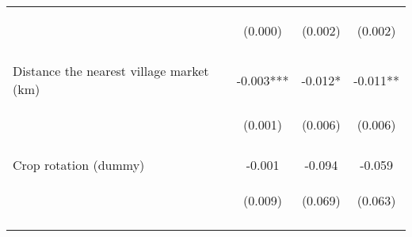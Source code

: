 \begin{center}
\begin{tabular}{lccc}
 & \begin{footnotesize}(0.000)\end{footnotesize} & \begin{footnotesize}(0.002)\end{footnotesize} & \begin{footnotesize}(0.002)\end{footnotesize} \\
\vspace{4pt} & \begin{footnotesize}[0.000]\end{footnotesize} & \begin{footnotesize}[0.257]\end{footnotesize} & \begin{footnotesize}[0.336]\end{footnotesize} \\
Distance the nearest village market (km) & -0.003*** & -0.012* & -0.011** \\
 & \begin{footnotesize}(0.001)\end{footnotesize} & \begin{footnotesize}(0.006)\end{footnotesize} & \begin{footnotesize}(0.006)\end{footnotesize} \\
\vspace{4pt} & \begin{footnotesize}[0.000]\end{footnotesize} & \begin{footnotesize}[0.053]\end{footnotesize} & \begin{footnotesize}[0.045]\end{footnotesize} \\
Crop rotation (dummy) & -0.001 & -0.094 & -0.059 \\
 & \begin{footnotesize}(0.009)\end{footnotesize} & \begin{footnotesize}(0.069)\end{footnotesize} & \begin{footnotesize}(0.063)\end{footnotesize} \\
\vspace{4pt} & \begin{footnotesize}[0.936]\end{footnotesize} & \begin{footnotesize}[0.173]\end{footnotesize} & \begin{footnotesize}[0.356]\end{footnotesize} \\

\end{tabular}
\end{center}
